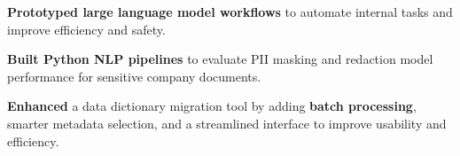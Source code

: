 
\begin{bullets}
	\item \textbf{Prototyped large language model workflows} to automate internal tasks and improve efficiency and safety.
	\item \textbf{Built Python NLP pipelines} to evaluate PII masking and redaction model performance for sensitive company documents.
	\item \textbf{Enhanced} a data dictionary migration tool by adding \textbf{batch processing}, smarter metadata selection, and a streamlined interface to improve usability and efficiency.
\end{bullets}